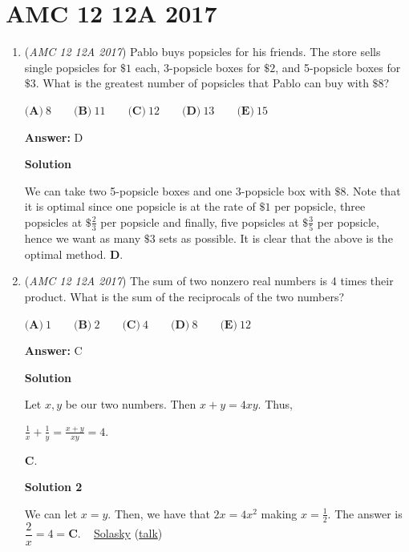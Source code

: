 \section{AMC 12 12A 2017}
        \begin{enumerate}
        	\item (\textit{AMC 12 12A 2017}) Pablo buys popsicles for his friends. The store sells single popsicles for $\$1$ each, 3-popsicle boxes for $\$2$, and 5-popsicle boxes for $\$3$. What is the greatest number of popsicles that Pablo can buy with $\$8$?


 $\textbf{(A)}\ 8\qquad\textbf{(B)}\ 11\qquad\textbf{(C)}\ 12\qquad\textbf{(D)}\ 13\qquad\textbf{(E)}\ 15$

 \textbf{Answer: }D



\textbf{Solution}

We can take two 5-popsicle boxes and one 3-popsicle box with $\$8$. Note that it is optimal since one popsicle is at the rate of $\$1$ per popsicle, three popsicles at $\$\frac{2}{3}$ per popsicle and finally, five popsicles at $\$\frac{3}{5}$ per popsicle, hence we want as many $\$3$ sets as possible. It is clear that the above is the optimal method. $\boxed{\textbf{D}}$.

 


	\item (\textit{AMC 12 12A 2017}) The sum of two nonzero real numbers is 4 times their product. What is the sum of the reciprocals of the two numbers?


 $\textbf{(A)}\ 1\qquad\textbf{(B)}\ 2\qquad\textbf{(C)}\ 4\qquad\textbf{(D)}\ 8\qquad\textbf{(E)}\ 12$

 \textbf{Answer: }C



\textbf{Solution}

Let $x, y$ be our two numbers. Then $x+y = 4xy$. Thus, 

 $\frac{1}{x} + \frac{1}{y} = \frac{x+y}{xy} = 4$. 

 $\boxed{ \textbf{C}}$.

 



\textbf{Solution 2}

We can let $x=y.$ Then, we have that $2x=4x^2$ making $x=\frac{1}{2}.$ The answer is $\dfrac{2}{x}=4=\boxed{ \textbf{C}}.$ ~ \href{https://artofproblemsolving.com/wiki/index.php?title=User:Solasky}{Solasky} (\href{https://artofproblemsolving.com/wiki/index.php?title=User\_talk:Solasky&action=edit&redlink=1}{talk})


\end{enumerate}
